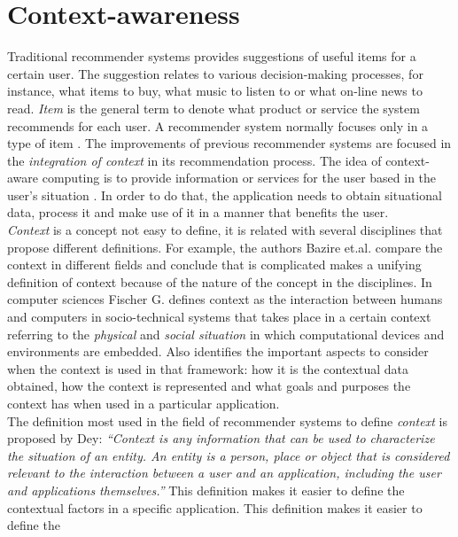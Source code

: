 \section{Context-awareness} \label{context-awareness}

Traditional recommender systems provides suggestions of useful items
for a certain user. The suggestion relates to various decision-making
processes, for instance, what items to buy, what music to listen to or
what on-line news to read. \textit{Item} is the general term to denote
what product or service the system recommends for each user. A
recommender system normally focuses only in a type of item
\cite{resnick1997recommender}.
The improvements of previous recommender systems are focused in the
\textit{integration of context} in its recommendation process. 
The idea of context-aware computing is to provide
information or services for the user based in the user’s situation
\cite{dey2001understanding}. In order to do that, the application 
needs to obtain situational data, process it and make use of it 
in a manner that benefits the user. \\ 
\textit{Context} is a concept not easy to define, it is related with
several disciplines that propose different definitions. For example,
the authors Bazire et.al.\cite{bazire2005understanding} compare the
context in different fields and conclude that is complicated makes a
unifying definition of context because of the nature of the concept in
the disciplines. In computer sciences Fischer
G.\cite{fischer2012context} defines context as the interaction between
humans and computers in socio-technical systems that takes place in a
certain context referring to the \textit{physical} and \textit{social
situation} in which  computational devices and environments are
embedded. Also identifies the important aspects to consider when the
context is used in that framework: how it is the contextual data
obtained, how the context is represented and what goals and purposes
the context has when used in a particular application. \\
The definition most used in the field of recommender systems to
define \textit{context} is proposed by Dey\cite{dey2001understanding}:
\textit{``Context is any information that can be used to characterize
the situation of an entity. An entity is a person, place or object
that is considered relevant to the interaction between a user and  an
application, including the user and applications themselves.''}  This
definition makes it easier to define the contextual factors in a
specific application. This definition makes it easier to define the
